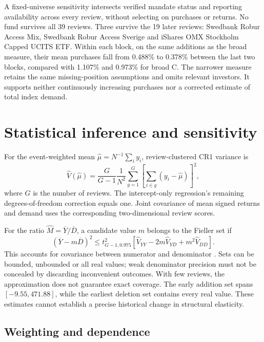 A fixed-universe sensitivity intersects verified mandate status and reporting availability across every review, without selecting on purchases or returns. No fund survives all 39 reviews. Three survive the 19 later reviews: Swedbank Robur Access Mix, Swedbank Robur Access Sverige and iShares OMX Stockholm Capped UCITS ETF. Within each block, on the same additions as the broad measure, their mean purchases fall from 0.488\% to 0.378\% between the last two blocks, compared with 1.107\% and 0.973\% for broad C. The narrower measure retains the same missing-position assumptions and omits relevant investors. It supports neither continuously increasing purchases nor a corrected estimate of total index demand.
\FloatBarrier

\section{Statistical inference and sensitivity}
\label{app:inference}

For the event-weighted mean $\widehat\mu=N^{-1}\sum_i y_i$, review-clustered CR1 variance is
\begin{equation}
 \widehat V(\widehat\mu)=\frac{G}{G-1}\frac{1}{N^2}
 \sum_{g=1}^G\left[\sum_{i\in g}(y_i-\widehat\mu)\right]^2,
\end{equation}
where $G$ is the number of reviews. The intercept-only regression's remaining degrees-of-freedom correction equals one. Joint covariance of mean signed returns and demand uses the corresponding two-dimensional review scores.

For the ratio $\widehat M=\overline Y/\overline D$, a candidate value $m$ belongs to the Fieller set if
\begin{equation}
 (\overline Y-m\overline D)^2\leq
 t_{G-1,0.975}^{2}
 \left[\widehat V_{YY}-2m\widehat V_{YD}+m^2\widehat V_{DD}\right].
 \label{eq:fieller}
\end{equation}
This accounts for covariance between numerator and denominator \citep{fieller1954}. Sets can be bounded, unbounded or all real values; weak denominator precision must not be concealed by discarding inconvenient outcomes. With few reviews, the approximation does not guarantee exact coverage. The early addition set spans $[-9.55,471.88]$, while the earliest deletion set contains every real value. These estimates cannot establish a precise historical change in structural elasticity.



\subsection{Weighting and dependence}
\label{app:dependence}



